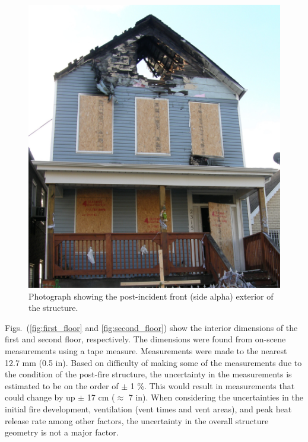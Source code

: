 \documentclass[11pt,oneside]{book}
\begin{document}
\begin{figure}[h!]
\centering
\includegraphics[width=.65\textwidth]{../Figures/exterior_alpha}
\caption{Photograph showing the post-incident front (side alpha) exterior of the structure.}
\label{fig:alpha_ex}
\end{figure}

Figs.~(\ref{fig:first_floor} and \ref{fig:second_floor}) show the interior dimensions of the first and second floor, respectively. The dimensions were found from on-scene measurements using a tape measure. Measurements were made to the nearest 12.7 mm (0.5 in). Based on difficulty of making some of the measurements due to the condition of the post-fire structure, the uncertainty in the measurements is estimated to be on the order of $\pm$ 1 \%. This would result in measurements that could change by up $\pm$ 17 cm ($\approx$ 7 in). When considering the uncertainties in the initial fire development, ventilation (vent times and vent areas), and peak heat release rate among other factors, the uncertainty in the overall structure geometry is not a major factor.

\end{document}
